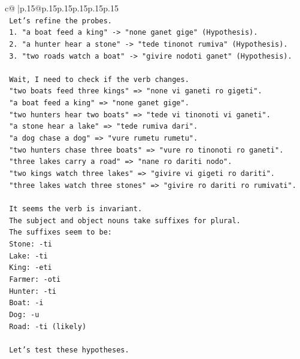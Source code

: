 \documentclass{article}
\begin{document}
{\begin{supertabular}{c@{$\;$}|p{.15\linewidth}@{}p{.15\linewidth}p{.15\linewidth}p{.15\linewidth}p{.15\linewidth}p{.15\linewidth}}
{{{\\ 
\texttt{   Let's refine the probes.} \\
\texttt{   1. "a boat feed a king" {-}> "none ganet gige" (Hypothesis).} \\
\texttt{   2. "a hunter hear a stone" {-}> "tede tinonot rumiva" (Hypothesis).} \\
\texttt{   3. "two roads watch a boat" {-}> "givire nodoti ganet" (Hypothesis).} \\
\\ 
\texttt{   Wait, I need to check if the verb changes.} \\
\texttt{   "two boats feed three kings" => "none vi ganeti ro gigeti".} \\
\texttt{   "a boat feed a king" => "none ganet gige".} \\
\texttt{   "two hunters hear two boats" => "tede vi tinonoti vi ganeti".} \\
\texttt{   "a stone hear a lake" => "tede rumiva dari".} \\
\texttt{   "a dog chase a dog" => "vure rumetu rumetu".} \\
\texttt{   "two hunters chase three boats" => "vure ro tinonoti ro ganeti".} \\
\texttt{   "three lakes carry a road" => "nane ro dariti nodo".} \\
\texttt{   "two kings watch three lakes" => "givire vi gigeti ro dariti".} \\
\texttt{   "three lakes watch three stones" => "givire ro dariti ro rumivati".} \\
\\ 
\texttt{   It seems the verb is invariant.} \\
\texttt{   The subject and object nouns take suffixes for plural.} \\
\texttt{   The suffixes seem to be:} \\
\texttt{   Stone: {-}ti} \\
\texttt{   Lake: {-}ti} \\
\texttt{   King: {-}eti} \\
\texttt{   Farmer: {-}oti} \\
\texttt{   Hunter: {-}ti} \\
\texttt{   Boat: {-}i} \\
\texttt{   Dog: {-}u} \\
\texttt{   Road: {-}ti (likely)} \\
\\ 
\texttt{   Let's test these hypotheses.} \\
}}}
\end{supertabular}}
\end{document}
